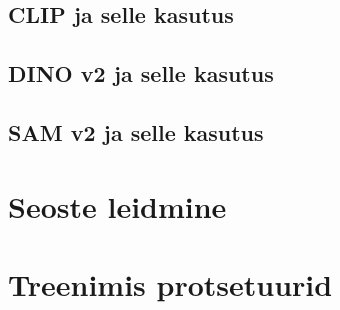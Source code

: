 \subsection{CLIP ja selle kasutus}

\subsection{DINO v2 ja selle kasutus}



\subsection{SAM v2  ja selle kasutus}


\section{Seoste leidmine}

\section{Treenimis protsetuurid}